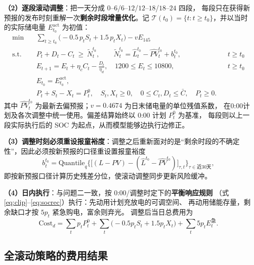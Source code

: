 \documentclass[withoutpreface,bwprint]{cumcmthesis}
\begin{document}
\textbf{（2）逐段滚动调整}：把一天分成 $0$--$6$/$6$--$12$/$12$--$18$/$18$--$24$ 四段，
每段只在获得新预报的发布时刻重解一次\textbf{剩余时段增量优化}。记
$\mathcal T(t_0)=\{t:t\ge t_0\}$，并以当时的实际储电量 $E^{\mathrm{act}}_{t_0}$ 为初值：
\begin{align}
\text{min}\quad & \sum_{t\ge t_0}\Big(-0.5\,p_tS_t+1.5\,p_tX_t\Big)-vE_{145}
\label{eq:adj_obj}\\
\text{s.t.}\quad & P_t+D_t-C_t\ \ge\ \tilde N^{t_0}_t,\qquad
\tilde N^{t_0}_t=\hat L^{t_0}_t-\widehat{PV}^{t_0}_t+b^{t_0}_t, && t\ge t_0 \label{eq:adj_bal}\\
& E_{t+1}=E_t+\eta_cC_t-\frac{D_t}{\eta_d},\quad 1200\le E_t\le10800, && t\ge t_0 \label{eq:adj_soc}\\
& E_{t_0}=E^{\mathrm{act}}_{t_0}, && \label{eq:adj_initial}\\
& P_t+S_t-X_t=P^0_t,\quad S_t,X_t\ge0,\quad 0\le C_t,D_t\le\bar C,\quad P_t\ge0. && \label{eq:adj_link}
\end{align}
其中 $\widehat{PV}^{t_0}_t$ 为最新去偏预报；$v=0.4674$ 为日末储电量的单位残值系数，
在0:00计划及各次调整中统一使用。偏差结算始终以 0:00 计划 $P^0_t$ 为基准，
每段则以上一段实际执行后的 SOC 为起点，从而模型能够边执行边修正。

\textbf{（3）调整时刻必须重设报童裕度}：调整之后重新面对的是“剩余时段的不确定性”，因此必须按新预报的口径重设置报童裕度
\begin{equation}
b^{t_0}_t=\mathrm{Quantile}_{q}\Big\{\big[(L-PV)-( \hat L^{t_0}-\widehat{PV}^{t_0})\big]_{\tau,t}\Big\}_{\tau\in\text{近30天}},
\label{eq:adjbuffer}
\end{equation}
即按新预报口径计算历史残差分位，使滚动调整同步更新风险缓冲。

\textbf{（4）日内执行}：与问题二一致，按 0:00/调整时定下的\textbf{平衡响应规则}
（式 \eqref{eq:clip}--\eqref{eq:socrec}）执行：先动用计划充放电的可调空间、
再动用储能存量，剩余缺口才按 $5p_t$ 紧急购电，富余则弃光。
调整后当日总费用为
\begin{equation}
\text{Cost}_d=\sum_t p_tP^0_t+\sum_t\Big(-0.5p_tS_t+1.5p_tX_t\Big)+\sum_t 5p_tE^{\text{急}}_t .
\label{eq:q3cost}
\end{equation}


\subsection{全滚动策略的费用结果}
\end{document}
